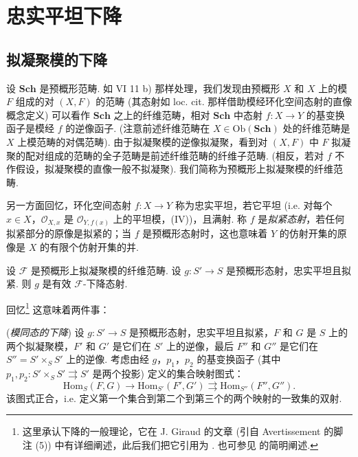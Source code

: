 \setcounter{chapter}{7}
\chapter{忠实平坦下降}

\section{拟凝聚模的下降}

设 $\mathbf{Sch}$ 是预概形范畴. 如 VI 11 b) 那样处理，我们发现由预概形 $X$ 和 $X$ 上的模 $F$ 组成的对 $(X, F)$ 的范畴 (其态射如 loc. cit. 那样借助模经环化空间态射的直像概念定义) 可以看作 $\mathbf{Sch}$ 之上的纤维范畴，相对 $\mathbf{Sch}$ 中态射 $f \colon X \to Y$ 的基变换函子是模经 $f$ 的逆像函子. (注意前述纤维范畴在 $X \in \mathrm{Ob}(\mathbf{Sch})$ 处的纤维范畴是 $X$ 上模范畴的对偶范畴). 由于拟凝聚模的逆像拟凝聚，看到对 $(X, F)$ 中 $F$ 拟凝聚的配对组成的范畴的全子范畴是前述纤维范畴的纤维子范畴. (相反，若对 $f$ 不作假设，拟凝聚模的直像一般不拟凝聚). 我们简称为预概形上拟凝聚模的纤维范畴.

另一方面回忆，环化空间态射 $f \colon X \to Y$ 称为忠实平坦，若它平坦 (i.e. 对每个 $x \in X$，$\mathcal{O}_{X,x}$ 是 $\mathcal{O}_{Y,f(x)}$ 上的平坦模，(IV))，且满射. 称 $f$ 是\emph{拟紧态射}，若任何拟紧部分的原像是拟紧的；当 $f$ 是预概形态射时，这也意味着 $Y$ 的仿射开集的原像是 $X$ 的有限个仿射开集的并.

\begin{theorem}\label{thm:VIII.1.1}
设 $\mathcal{F}$ 是预概形上拟凝聚模的纤维范畴. 设 $g \colon S' \to S$ 是预概形态射，忠实平坦且拟紧. 则 $g$ 是有效 $\mathcal{F}$-下降态射.
\end{theorem}

回忆\footnote{这里承认下降的一般理论，它在 J. Giraud 的文章 (引自 Avertissement 的脚注 (5)) 中有详细阐述，此后我们把它引用为 \cite{exp08-D}. 也可参见 \cite{exp08-2} 的简明阐述.} 这意味着两件事：

\begin{corollary}\label{cor:VIII.1.2}
(\emph{模同态的下降}) 设 $g \colon S' \to S$ 是预概形态射，忠实平坦且拟紧，$F$ 和 $G$ 是 $S$ 上的两个拟凝聚模，$F'$ 和 $G'$ 是它们在 $S'$ 上的逆像，最后 $F''$ 和 $G''$ 是它们在 $S'' = S' \times_S S'$ 上的逆像. 考虑由经 $g$，$p_1$，$p_2$ 的基变换函子 (其中 $p_1, p_2 \colon S' \times_S S' \rightrightarrows S'$ 是两个投影) 定义的集合映射图式：
\[
\mathrm{Hom}_S(F, G) \longrightarrow \mathrm{Hom}_{S'}(F', G') \rightrightarrows \mathrm{Hom}_{S''}(F'', G'').
\]
该图式正合，i.e. 定义第一个集合到第二个到第三个的两个映射的一致集的双射.
\end{corollary}

